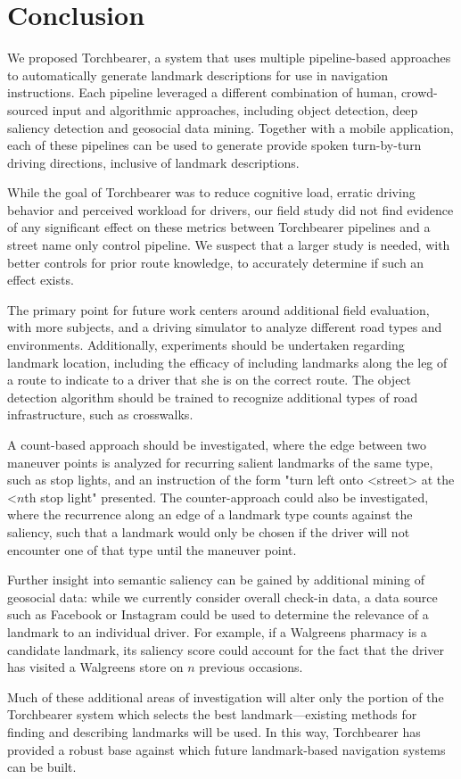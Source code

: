 \chapter{Conclusion}\label{conclusion}

We proposed Torchbearer, a system that uses multiple pipeline-based approaches to automatically generate landmark descriptions for use in navigation instructions. Each pipeline leveraged a different combination of human, crowd-sourced input and algorithmic approaches, including object detection, deep saliency detection and geosocial data mining. Together with a mobile application, each of these pipelines can be used to generate provide spoken turn-by-turn driving directions, inclusive of landmark descriptions.

While the goal of Torchbearer was to reduce cognitive load, erratic driving behavior and perceived workload for drivers, our field study did not find evidence of any significant effect on these metrics between Torchbearer pipelines and a street name only control pipeline. We suspect that a larger study is needed, with better controls for prior route knowledge, to accurately determine if such an effect exists.

The primary point for future work centers around additional field evaluation, with more subjects, and a driving simulator to analyze different road types and environments. Additionally, experiments should be undertaken regarding landmark location, including the efficacy of including landmarks along the leg of a route to indicate to a driver that she is on the correct route. The object detection algorithm should be trained to recognize additional types of road infrastructure, such as crosswalks.

A count-based approach should be investigated, where the edge between two maneuver points is analyzed for recurring salient landmarks of the same type, such as stop lights, and an instruction of the form "turn left onto <street> at the <$n$th stop light" presented. The counter-approach could also be investigated, where the recurrence along an edge of a landmark type counts against the saliency, such that a landmark would only be chosen if the driver will not encounter one of that type until the maneuver point.

Further insight into semantic saliency can be gained by additional mining of geosocial data: while we currently consider overall check-in data, a data source such as Facebook or Instagram could be used to determine the relevance of a landmark to an individual driver. For example, if a Walgreens pharmacy is a candidate landmark, its saliency score could account for the fact that the driver has visited a Walgreens store on $n$ previous occasions.

Much of these additional areas of investigation will alter only the portion of the Torchbearer system which selects the best landmark---existing methods for finding and describing landmarks will be used. In this way, Torchbearer has provided a robust base against which future landmark-based navigation systems can be built.